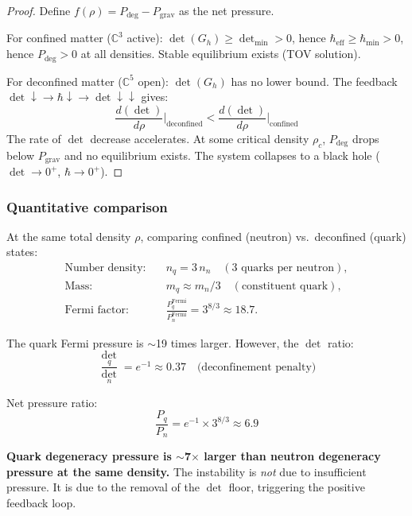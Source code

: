 \documentclass[12pt]{article}
\theoremstyle{remark}
\theoremstyle{definition}
\newcommand{\CC}{\mathbb{C}}
\begin{document}
\begin{proof}
Define $f(\rho) = P_\text{deg} - P_\text{grav}$ as the net pressure.

For confined matter ($\CC^3$ active):
$\det(G_h) \geq \det_\text{min} > 0$, hence $\hbar_\text{eff} \geq \hbar_\text{min} > 0$, hence $P_\text{deg} > 0$ at all densities. Stable equilibrium exists (TOV solution).

For deconfined matter ($\CC^5$ open):
$\det(G_h)$ has no lower bound. The feedback $\det \downarrow \to \hbar \downarrow \to \det \downarrow\downarrow$ gives:
\begin{equation}
\frac{d(\det)}{d\rho}\bigg|_\text{deconfined} < \frac{d(\det)}{d\rho}\bigg|_\text{confined}
\end{equation}
The rate of $\det$ decrease accelerates. At some critical density $\rho_c$, $P_\text{deg}$ drops below $P_\text{grav}$ and no equilibrium exists. The system collapses to a black hole ($\det \to 0^+$, $\hbar \to 0^+$).
\end{proof}

\subsubsection{Quantitative comparison}

At the same total density $\rho$, comparing confined (neutron) vs.\ deconfined (quark) states:
\begin{align}
\text{Number density:} &\quad n_q = 3\,n_n \quad (\text{3 quarks per neutron}), \\
\text{Mass:} &\quad m_q \approx m_n/3 \quad (\text{constituent quark}), \\
\text{Fermi factor:} &\quad \frac{P_q^\text{Fermi}}{P_n^\text{Fermi}} = 3^{8/3} \approx 18.7.
\end{align}

The quark Fermi pressure is $\sim$19 times larger. However, the $\det$ ratio:
\begin{equation}
\frac{\det_q}{\det_n} = e^{-1} \approx 0.37 \quad \text{(deconfinement penalty)}
\end{equation}

Net pressure ratio:
\begin{equation}
\frac{P_q}{P_n} = e^{-1} \times 3^{8/3} \approx 6.9
\end{equation}

\textbf{Quark degeneracy pressure is $\sim$7$\times$ larger than neutron degeneracy pressure at the same density.} The instability is \emph{not} due to insufficient pressure. It is due to the removal of the $\det$ floor, triggering the positive feedback loop.
\end{document}
